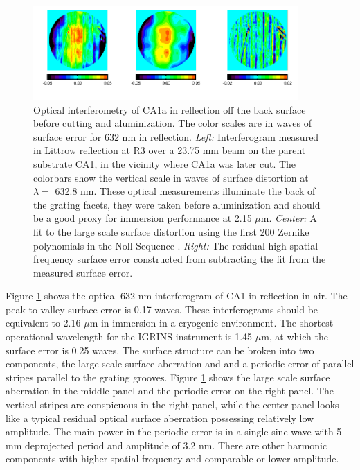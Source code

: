 \begin{figure}
  \centering
\includegraphics[width=0.9\textwidth]{chSPIE_2012_CA1/figs/CA1a_fig_scl2}
  \caption{Optical interferometry of CA1a in reflection off the back surface before cutting and aluminization.  The color scales are in waves of surface error for 632 nm in reflection.  \emph{Left:} Interferogram measured in Littrow reflection at R3 over a 23.75 mm beam on the parent substrate CA1, in the vicinity where CA1a was later cut.  The colorbars show the vertical scale in waves of surface distortion at $\lambda = $ 632.8 nm.  These optical measurements illuminate the back of the grating facets, they were taken before aluminization and should be a good proxy for immersion performance at 2.15 $\mu$m. \emph{Center:} A fit to the large scale surface distortion using the first 200 Zernike polynomials in the Noll Sequence \cite{noll1976}.  \emph{Right:} The residual high spatial frequency surface error constructed from subtracting the fit from the measured surface error.}
  \label{fig:gram}
\end{figure}

Figure \ref{fig:gram} shows the optical 632 nm interferogram of CA1 in reflection in air.  The peak to valley surface error is 0.17 waves.  These interferograms should be equivalent to 2.16 $\mu$m in immersion in a cryogenic environment.  The shortest operational wavelength for the IGRINS instrument is 1.45 $\mu$m, at which the surface error is 0.25 waves.  The surface structure can be broken into two components, the large scale surface aberration and and a periodic error of parallel stripes parallel to the grating grooves.  Figure \ref{fig:gram} shows the large scale surface aberration in the middle panel and the periodic error on the right panel.  The vertical stripes are conspicuous in the right panel, while the center panel looks like a typical residual optical surface aberration possessing relatively low amplitude.  The main power in the periodic error is in a single sine wave with 5 mm deprojected period and amplitude of 3.2 nm.  There are other harmonic components with higher spatial frequency and comparable or lower amplitude.  

